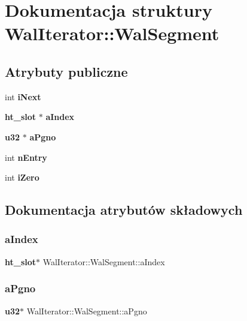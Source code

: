 \section{Dokumentacja struktury Wal\+Iterator\+::Wal\+Segment}
\label{struct_wal_iterator_1_1_wal_segment}
\subsection*{Atrybuty publiczne}
\begin{DoxyCompactItemize}
\item 
int \textbf{ i\+Next}
\item 
\textbf{ ht\+\_\+slot} $\ast$ \textbf{ a\+Index}
\item 
\textbf{ u32} $\ast$ \textbf{ a\+Pgno}
\item 
int \textbf{ n\+Entry}
\item 
int \textbf{ i\+Zero}
\end{DoxyCompactItemize}


\subsection{Dokumentacja atrybutów składowych}
\mbox{\label{struct_wal_iterator_1_1_wal_segment_adec397836a127acafcc551cb1fdcd851}} 
\subsubsection{aIndex}
{\footnotesize\ttfamily \textbf{ ht\+\_\+slot}$\ast$ Wal\+Iterator\+::\+Wal\+Segment\+::a\+Index}

\mbox{\label{struct_wal_iterator_1_1_wal_segment_a5e43273a11dc5856934834c0cdf7f198}} 
\subsubsection{aPgno}
{\footnotesize\ttfamily \textbf{ u32}$\ast$ Wal\+Iterator\+::\+Wal\+Segment\+::a\+Pgno}

\mbox{\label{struct_wal_iterator_1_1_wal_segment_a329c939b196f907fe98cf762bb07d291}} 
